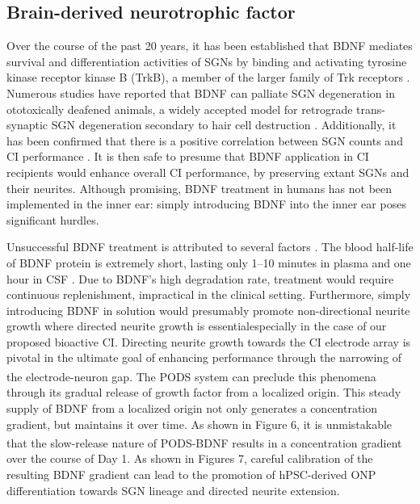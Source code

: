\documentclass[review]{elsarticle}
\begin{document}
\subsection {Brain-derived neurotrophic factor} 
Over the course of the past 20 years, it has been established that BDNF mediates survival and differentiation activities of SGNs by binding and activating tyrosine kinase receptor kinase B (TrkB), a member of the larger family of Trk receptors \cite{green2012}. Numerous studies have reported that BDNF can palliate SGN degeneration in ototoxically deafened animals, a widely accepted model for retrograde trans-synaptic SGN degeneration secondary to hair cell destruction \cite{Gillespie2003,Pettingill2008,Yamagata2004,Zanin2014}. Additionally, it has been confirmed that there is a positive correlation between SGN counts and CI performance \cite{Seyyedi2014}. It is then safe to presume that BDNF application in CI recipients would enhance overall CI performance, by preserving extant SGNs and their neurites.  Although promising, BDNF treatment in humans has not been implemented in the inner ear: simply introducing BDNF into the inner ear poses significant hurdles. 

\indent Unsuccessful BDNF treatment is attributed to several factors \cite{Henriques2010}. The blood half-life of BDNF protein is extremely short, lasting only 1–10 minutes in plasma \cite{Poduslo1996,Sakane1997} and one hour in CSF \cite{Soderquist2009}. Due to BDNF's high degradation rate, treatment would require continuous replenishment, impractical in the clinical setting. Furthermore, simply introducing BDNF in solution would presumably promote non-directional neurite growth where directed neurite growth is essential\textendash especially in the case of our proposed bioactive CI. Directing neurite growth towards the CI electrode array is pivotal in the ultimate goal of enhancing performance through the narrowing of the electrode-neuron gap. The PODS\textsuperscript{\textregistered} system can preclude this phenomena through its gradual release of growth factor from a localized origin. This steady supply of BDNF from a localized origin not only generates a concentration gradient, but maintains it over time. As shown in Figure 6, it is unmistakable that the slow-release nature of PODS\textsuperscript{\textregistered}-BDNF results in a concentration gradient over the course of Day 1. As shown in Figures 7, careful calibration of the resulting BDNF gradient can lead to the promotion of hPSC-derived ONP differentiation towards SGN lineage and directed neurite extension. 
\end{document}
